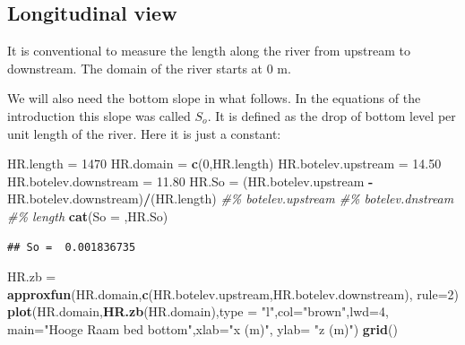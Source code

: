 \documentclass[
]{article}
\newenvironment{Shaded}{\begin{snugshade}}{\end{snugshade}}
\newcommand{\AttributeTok}[1]{\textcolor[rgb]{0.13,0.29,0.53}{#1}}
\newcommand{\CommentTok}[1]{\textcolor[rgb]{0.56,0.35,0.01}{\textit{#1}}}
\newcommand{\DecValTok}[1]{\textcolor[rgb]{0.00,0.00,0.81}{#1}}
\newcommand{\FloatTok}[1]{\textcolor[rgb]{0.00,0.00,0.81}{#1}}
\newcommand{\FunctionTok}[1]{\textcolor[rgb]{0.13,0.29,0.53}{\textbf{#1}}}
\newcommand{\NormalTok}[1]{#1}
\newcommand{\OtherTok}[1]{\textcolor[rgb]{0.56,0.35,0.01}{#1}}
\newcommand{\SpecialCharTok}[1]{\textcolor[rgb]{0.81,0.36,0.00}{\textbf{#1}}}
\newcommand{\StringTok}[1]{\textcolor[rgb]{0.31,0.60,0.02}{#1}}
\begin{document}
\hypertarget{longitudinal-view}{%
\subsection{Longitudinal view}\label{longitudinal-view}}

It is conventional to measure the length along the river from upstream
to downstream. The domain of the river starts at 0 m.

We will also need the bottom slope in what follows. In the equations of
the introduction this slope was called \(S_o\). It is defined as the
drop of bottom level per unit length of the river. Here it is just a
constant:

\begin{Shaded}
\begin{Highlighting}[]
\NormalTok{HR.length }\OtherTok{=} \DecValTok{1470}
\NormalTok{HR.domain }\OtherTok{=} \FunctionTok{c}\NormalTok{(}\DecValTok{0}\NormalTok{,HR.length)}
\NormalTok{HR.botelev.upstream }\OtherTok{=} \FloatTok{14.50}
\NormalTok{HR.botelev.downstream }\OtherTok{=} \FloatTok{11.80}
\NormalTok{HR.So }\OtherTok{=}\NormalTok{ (HR.botelev.upstream }\SpecialCharTok{{-}}\NormalTok{HR.botelev.downstream)}\SpecialCharTok{/}\NormalTok{(HR.length) }\CommentTok{\#\% botelev.upstream \#\% botelev.dnstream \#\% length}
\FunctionTok{cat}\NormalTok{(}\StringTok{\textquotesingle{}So = \textquotesingle{}}\NormalTok{,HR.So)}
\end{Highlighting}
\end{Shaded}

\begin{verbatim}
## So =  0.001836735
\end{verbatim}

\begin{Shaded}
\begin{Highlighting}[]
\NormalTok{HR.zb }\OtherTok{=} \FunctionTok{approxfun}\NormalTok{(HR.domain,}\FunctionTok{c}\NormalTok{(HR.botelev.upstream,HR.botelev.downstream),}
                  \AttributeTok{rule=}\DecValTok{2}\NormalTok{)}
\FunctionTok{plot}\NormalTok{(HR.domain,}\FunctionTok{HR.zb}\NormalTok{(HR.domain),}\AttributeTok{type =} \StringTok{"l"}\NormalTok{,}\AttributeTok{col=}\StringTok{"brown"}\NormalTok{,}\AttributeTok{lwd=}\DecValTok{4}\NormalTok{,}
     \AttributeTok{main=}\StringTok{"Hooge Raam bed bottom"}\NormalTok{,}\AttributeTok{xlab=}\StringTok{"x (m)"}\NormalTok{, }\AttributeTok{ylab=} \StringTok{"z (m)"}\NormalTok{)}
\FunctionTok{grid}\NormalTok{()}
\end{Highlighting}
\end{Shaded}
\end{document}
